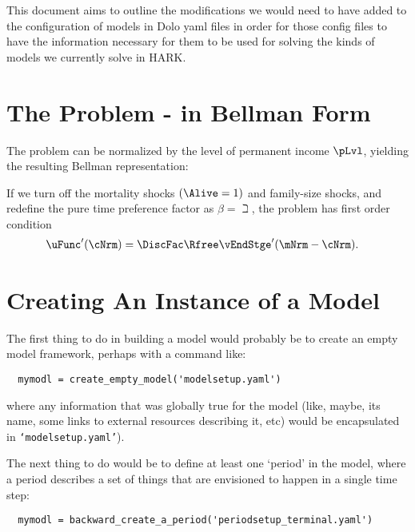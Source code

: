 \documentclass[SolvingMicroDSOPs]{subfiles}
\begin{document}

This document aims to outline the modifications we would need to have added to the configuration of models in Dolo yaml files in order for those config files to have the information necessary for them to be used for solving the kinds of models we currently solve in HARK.

\section{The Problem - in Bellman Form}





The problem can be normalized by the level of permanent income $\pLvl$, yielding the resulting Bellman representation:






If we turn off the mortality shocks $(\Alive=1)$ and family-size shocks, and redefine the pure time preference factor as $\beta=\beth$, the problem has first order condition
\begin{align}
   \uFunc^{\prime}(\cNrm) & = \DiscFac \Rfree \vEndStge^{\prime}(\mNrm - \cNrm).  \label{eq:FOCstep}
\end{align}

\section{Creating An Instance of a Model}

The first thing to do in building a model would probably be to create an empty model framework, perhaps with a command like:
\begin{verbatim}
  mymodl = create_empty_model('modelsetup.yaml')
\end{verbatim}
where any information that was globally true for the model (like, maybe, its name, some links to external resources describing it, etc) would be encapsulated in \texttt{`modelsetup.yaml'}).

The next thing to do would be to define at least one `period' in the model, where a period describes a set of things that are envisioned to happen in a single time step:
\begin{verbatim}
  mymodl = backward_create_a_period('periodsetup_terminal.yaml')
\end{verbatim}
\end{document}
